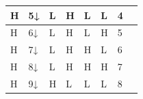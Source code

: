 \documentclass[a4paper, 11pt, uplatex]{jsarticle}
\begin{document}
\begin{table}[H]
\begin{center}
\begin{tabular}{|l|l|l|l|l|l|l|l|}
H                                                                 & 5↓                                                                & L                                                               & H                                                               & L                                                               & L                                                               & 4                                                                       &                     \\ \hline
H                                                                 & 6↓                                                                & L                                                               & H                                                               & L                                                               & H                                                               & 5                                                                       &                     \\ \hline
H                                                                 & 7↓                                                                & L                                                               & H                                                               & H                                                               & L                                                               & 6                                                                       &                     \\ \hline
H                                                                 & 8↓                                                                & L                                                               & H                                                               & H                                                               & H                                                               & 7                                                                       &                     \\ \hline
H                                                                 & 9↓                                                                & H                                                               & L                                                               & L                                                               & L                                                               & 8                                                                       &                     \\ \hline

\end{tabular}
\end{center}
\end{table}
\end{document}
